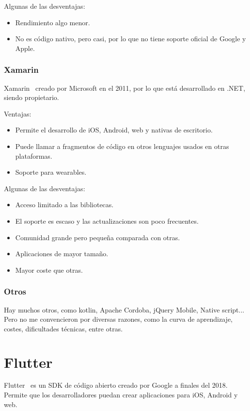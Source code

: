 Algunas de las desventajas:
\begin{itemize}
	\item Rendimiento algo menor.
	\item No es código nativo, pero casi, por lo que no tiene soporte oficial de Google y Apple.
\end{itemize}

\subsubsection{Xamarin}
Xamarin~\cite{wiki:xamarin} creado por Microsoft en el 2011, por lo que está desarrollado en .NET, siendo propietario.

Ventajas:
\begin{itemize}
	\item Permite el desarrollo de iOS, Android, web y nativas de escritorio.
	\item Puede llamar a fragmentos de código en otros lenguajes usados en otras plataformas.
	\item Soporte para wearables.
\end{itemize}

Algunas de las desventajas:
\begin{itemize}
	\item Acceso limitado a las bibliotecas.
	\item El soporte es escaso y las actualizaciones son poco frecuentes.
	\item Comunidad grande pero pequeña comparada con otras.
	\item Aplicaciones de mayor tamaño.
	\item Mayor coste que otras.
\end{itemize}

\subsubsection{Otros}
Hay muchos otros, como kotlin, Apache Cordoba, jQuery Mobile, Native script...
Pero no me convencieron por diversas razones, como la curva de aprendizaje, costes, dificultades técnicas, entre otras.
 
\section{Flutter}
Flutter~\cite{wiki:flutter} es un SDK de código abierto creado por Google a finales del 2018. Permite que los desarrolladores puedan crear aplicaciones para iOS, Android y web.

